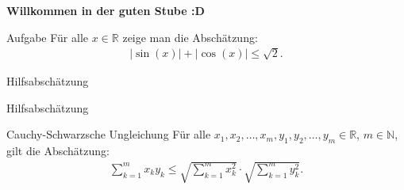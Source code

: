 \documentclass[10pt]{beamer}
\title{}
\author{Artur's Mathematikstübchen}
\date{}
\def\bN{\mathbb{N}}
\def\bR{\mathbb{R}}
\begin{document}

\begin{frame}
    \begin{center}
        \textbf{\huge Willkommen in der guten Stube \newline \newline :D}
    \end{center}
\end{frame}




\begin{frame}
    \begin{alertblock}{Aufgabe}
        Für alle \( x \in \bR \) zeige man die Abschätzung:
        \begin{align*}
            \left\vert \sin\left( x \right) \right\vert + \left\vert \cos\left( x \right) \right\vert
            \leq \sqrt{2}.
        \end{align*}
    \end{alertblock}
\end{frame}



\begin{frame}{Hilfsabschätzung}
    
\end{frame}



\begin{frame}{Hilfsabschätzung}
    \begin{block}{Cauchy-Schwarzsche Ungleichung}
        Für alle \( x_{1}, x_{2}, \ldots, x_{m}, y_{1}, y_{2}, \ldots, y_{m} \in \bR \), \( m \in \bN \), gilt die Abschätzung:
        \begin{align*}
            \sum_{k = 1}^{m} x_{k} y_{k}
            \leq \sqrt{\sum_{k = 1}^{m} x_{k}^{2}} \cdot \sqrt{\sum_{k = 1}^{m} y_{k}^{2}}.
        \end{align*}
    \end{block}
\end{frame}
\end{document}
